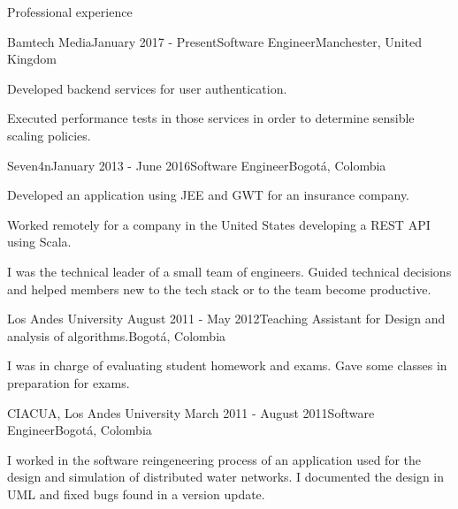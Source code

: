 \documentclass{resume} %
\def\uniandes{Los Andes University }
\begin{document}
\begin{rSection}{Professional experience}

\begin{rSubsection}{Bamtech Media}{January 2017 - Present}{Software Engineer}{Manchester, United Kingdom}
\item Developed backend services for user authentication.
\item Executed performance tests in those services in order to determine sensible scaling policies.
\end{rSubsection}

\begin{rSubsection}{Seven4n}{January 2013 - June 2016}{Software Engineer}{Bogot\'a, Colombia}
\item Developed an application using JEE and GWT for an insurance company.
\item Worked remotely for a company in the United States developing a REST API using Scala.
\item I was the technical leader of a small team of engineers. Guided technical decisions and helped members new to the tech stack or to the team become productive.
\end{rSubsection}


\begin{rSubsection}{\uniandes}{August 2011 - May 2012}{Teaching Assistant for Design and analysis of algorithms.}{Bogot\'a, Colombia}
\item I was in charge of evaluating student homework and exams. Gave some classes in preparation for exams.
\end{rSubsection}


\begin{rSubsection}{CIACUA, \uniandes}{March 2011 - August 2011}{Software Engineer}{Bogot\'a, Colombia}
\item I worked in the software reingeneering process of an application used for the design and simulation of distributed water networks. I documented the design in UML and fixed bugs found in a version update.
\end{rSubsection}

\end{rSection}
\end{document}
